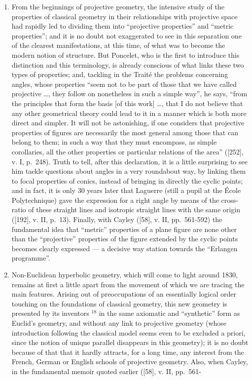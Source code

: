 \begin{enumerate}
\item
  From the beginnings of projective geometry, the intensive study of the properties of classical geometry in their relationships with projective space had rapidly led to dividing them into ``projective properties'' and ``metric properties''; and it is no doubt not exaggerated to see in this separation one of the clearest manifestations, at this time, of what was to become the modern notion of structure. But Poncelet, who is the first to introduce this distinction and this terminology, is already conscious of what links these two types of properties; and, tackling in the Traité the problems concerning angles, whose properties ``seem not to be part of those that we have called projective \ldots, they follow on nonetheless in such a simple way'', he says, ``from the principles that form the basis {[}of this work{]} \ldots, that I do not believe that any other geometrical theory could lead to it in a manner which is both more direct and simpler. It will not be astonishing, if one considers that projective properties of figures are necessarily the most general among those that can belong to them; in such a way that they must encompass, as simple corollaries, all the other properties or particular relations of the area'' ({[}252{]}, v. I, p.~248). Truth to tell, after this declaration, it is a little surprising to see him tackle questions about angles in a very roundabout way, by linking them to focal properties of conics, instead of bringing in directly the cyclic points; and in fact, it is only 30 years later that Laguerre (still a pupil at the École Polytechnique) gave the expression for a right angle by means of the cross-ratio of these straight lines and isotropic straight lines with the same origin ({[}192{]}, v. II, p.~13). Finally, with Cayley ({[}58{]}, v. II, pp.~561-592) the fundamental idea that ``metric'' properties of a plane figure are none other than the ``projective'' properties of the figure extended by the cyclic points becomes clearly expressed --- a decisive way station towards the ``Erlangen programme''.
\item
  Non-Euclidean hyperbolic geometry, which will come to light around 1830, remains at first a little apart from the movement of which we are tracing the main features. Arising out of preoccupations of an essentially logical order touching on the foundations of classical geometry, this new geometry is presented by its inventors \(^{18}\) in the same axiomatic and ``synthetic'' form as Euclid's geometry, and without any link to projective geometry (whose introduction following the classical model seems even to be excluded a priori, since the notion of unique parallel disappears in this geometry); it is no doubt because of that that it hardly attracts, for a long time, any interest from the French, German or English schools of projective geometry. Also, when Cayley, in the fundamental memoir quoted earlier ({[}58{]}, v. II, pp.~561-
\end{enumerate}

